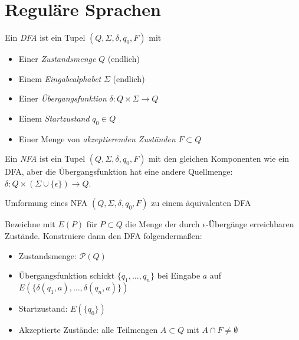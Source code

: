 \documentclass{cheat-sheet}
\begin{document}


\section{Reguläre Sprachen}

\begin{definition}
Ein \emph{DFA} ist ein Tupel $(Q, \Sigma, \delta, q_{0}, F)$ mit

\begin{itemize}{\leftmargin=0em}
  \setlength{\leftmargin}{0pt}
  \item Einer \emph{Zustandsmenge} $Q$ (endlich)
  \item Einem \emph{Eingabealphabet} $\Sigma$ (endlich)
  \item Einer \emph{Übergangsfunktion} $\delta : Q \times \Sigma \to Q$
  \item Einem \emph{Startzustand} $q_{0} \in Q$
  \item Einer Menge von \emph{akzeptierenden Zuständen} $F \subset Q$
\end{itemize}
\end{definition}

\begin{definition}
Ein \emph{NFA} ist ein Tupel $(Q, \Sigma, \delta, q_{0}, F)$ mit den gleichen Komponenten wie ein DFA, aber die Übergangsfunktion hat eine andere Quellmenge: $\delta : Q \times (\Sigma \cup \{ \epsilon \}) \to Q$.
\end{definition}

\begin{alg}
Umformung eines NFA $(Q, \Sigma, \delta, q_{0}, F)$ zu einem äquivalenten DFA
\end{alg}

Bezeichne mit $E(P)$ für $P \subset Q$ die Menge der durch $\epsilon$-Übergänge erreichbaren Zustände. Konstruiere dann den DFA folgendermaßen:

\begin{itemize}
  \item Zustandsmenge: $\mathcal{P}(Q)$
  \item Übergangsfunktion schickt $\{q_{1}, \ldots, q_{n}\}$ bei Eingabe $a$ auf $E(\{\delta(q_{1}, a), \ldots, \delta(q_{n}, a)\})$
  \item Startzustand: $E(\{q_{0}\})$
  \item Akzeptierte Zustände: alle Teilmengen $A \subset Q$ mit $A \cap F \neq \emptyset$
\end{itemize}
\end{document}
